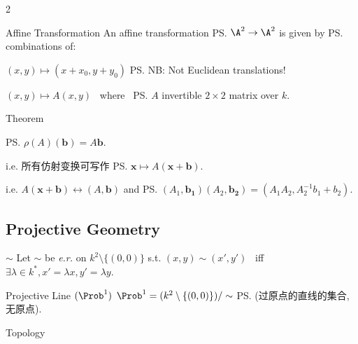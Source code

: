 \documentclass{note}
\begin{document}
\begin{multicols}{2}
    \begin{MyTh}{Affine Transformation}
        An affine transformation \ps{$\A^2\to \A^2$} is given by \ps{combinations of}:

        \quad {} $(x,y) \mapsto (x+x_0,y+y_0)$ \hspace{50pt} \ps{\tiny NB: Not Euclidean translations!}
        
        \quad {} $(x,y) \mapsto A(x,y)$ \ where \ \ps{$A$ invertible $2\times 2$ matrix over $k$.}

        \quad \begin{MyTh}{Theorem}
            
            \quad {} \ps{$\rho(A)(\mathbf{b})=A\mathbf{b}$.}

            \qquad i.e.  {\tiny 所有仿射变换可写作} \ps{$\mathbf{x} \mapsto A(\mathbf{x}+\mathbf{b})$}.

            \qquad i.e.  $A(\mathbf{x}+\mathbf{b})\leftrightarrow (A,\mathbf{b})$ and \ps{$(A_1,\mathbf{b_1})(A_2,\mathbf{b_2})=(A_1A_2, A_2^{-1}b_1+b_2)$}.
        \end{MyTh}
    \end{MyTh}

    
    \subsection{Projective Geometry}

    \begin{MyTh}{$\sim$}
        Let $\sim$ be \textit{e.r.} on $k^2\setminus\{(0,0)\}$ s.t. $(x,y) \sim (x',y')$ \ iff \ $\exists \lambda \in k^*, x'=\lambda x, y'=\lambda y$.
    \end{MyTh}

    \begin{MyTh}{Projective Line $(\Prob^1)$}
        $\Prob^1 = (k^2\setminus\{(0,0)\})/\sim$ \quad \ps{\tiny (过原点的直线的集合,无原点)}.

        \quad \begin{MyTh}{Topology}\tiny
             \quad {}
        \end{MyTh}
    \end{MyTh}


\end{multicols}
\end{document}
